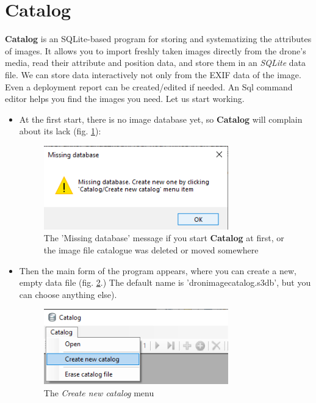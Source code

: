 \documentclass[a4paper,12pt]{article}
\begin{document}
\section{Catalog}

\textbf{Catalog} is an SQLite-based program for storing and systematizing the attributes of images. It allows you to import freshly taken images directly from the drone's media, read their attribute and position data, and store them in an \textit{SQLite} data file. We can store data interactively not only from the EXIF data of the image. Even a deployment report can be created/edited if needed. An Sql command editor helps you find the images you need.
Let us start working.

\begin{itemize}
	

\item At the first start, there is no image database yet, so \textbf{Catalog} will complain about its lack (fig. \ref {fig:missingdb}): 

\begin{figure}
	\centering
	\includegraphics[width=8cm]{missingdb.png}
	\caption{The 'Missing database' message if you start \textbf{Catalog} at first, or the image file catalogue was deleted or moved somewhere}
	\label{fig:missingdb}
\end{figure}

\item Then the main form of the program appears, where you can create a new, empty data file (fig. \ref {fig:createnewcatalog}.) The default name is 'dronimagecatalog.s3db', but you can choose anything else). 

\begin{figure}
	\centering
	\includegraphics[width=8cm]{createnewcatalog.png}
	\caption{The \textit{Create new catalog} menu}
	\label{fig:createnewcatalog}
\end{figure}


\end{itemize}
\end{document}
